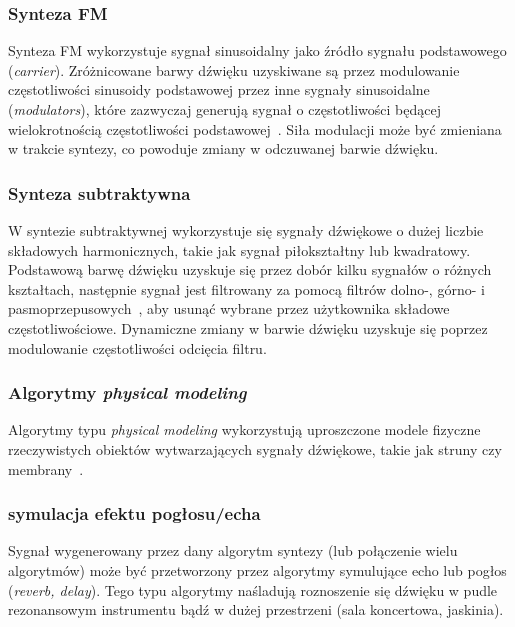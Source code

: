 \subsubsection{Synteza FM}

Synteza FM wykorzystuje sygnał sinusoidalny jako źródło sygnału podstawowego
(\textit{carrier}). Zróżnicowane barwy dźwięku uzyskiwane są przez modulowanie
częstotliwości sinusoidy podstawowej przez inne sygnały sinusoidalne (\textit{modulators}),
które zazwyczaj generują sygnał o częstotliwości będącej wielokrotnością
częstotliwości podstawowej~\cite{spectral_audio_processing}. Siła modulacji
może być zmieniana w trakcie syntezy, co powoduje zmiany
w odczuwanej barwie dźwięku.

\subsubsection{Synteza subtraktywna}

W syntezie subtraktywnej wykorzystuje się sygnały dźwiękowe o dużej liczbie
składowych harmonicznych, takie jak sygnał piłokształtny lub kwadratowy.
Podstawową barwę dźwięku uzyskuje się przez dobór kilku sygnałów
o różnych kształtach, następnie sygnał jest filtrowany za pomocą filtrów
dolno-, górno- i pasmoprzepusowych~\cite{digital_filters}, aby
usunąć wybrane przez użytkownika składowe częstotliwościowe.
Dynamiczne zmiany w barwie dźwięku uzyskuje się poprzez modulowanie
częstotliwości odcięcia filtru.

\subsubsection{Algorytmy \textit{physical modeling}}

Algorytmy typu \textit{physical modeling} wykorzystują uproszczone
modele fizyczne rzeczywistych obiektów wytwarzających sygnały dźwiękowe,
takie jak struny czy membrany~\cite{lisp_synthesis}.


\subsubsection{symulacja efektu pogłosu/echa~\cite{reverb}~\cite{freeverb}}

Sygnał wygenerowany przez dany algorytm syntezy (lub połączenie wielu algorytmów)
może być przetworzony przez algorytmy symulujące echo lub pogłos (\textit{reverb, delay}).
Tego typu algorytmy naśladują roznoszenie się dźwięku w pudle rezonansowym
instrumentu bądź w dużej przestrzeni (sala koncertowa, jaskinia).
 


